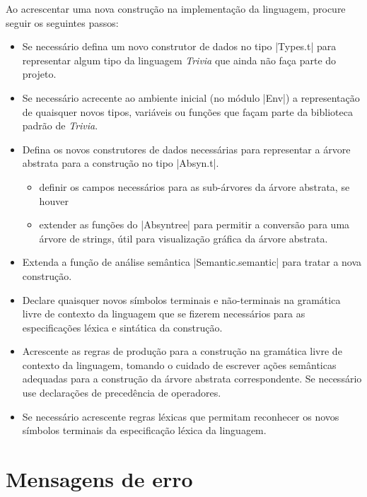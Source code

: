 \documentclass[a4paper,11pt,brazil]{article}
\newcommand{\lang}{\textsl{Trivia}}
\begin{document}
Ao acrescentar uma nova construção na implementação da linguagem, procure
seguir os seguintes passos:
\begin{itemize}
  \item Se necessário defina um novo construtor de dados no tipo
  \pyginline|Types.t| para representar algum tipo da linguagem \lang{}
  que ainda não faça parte do projeto.

  \item Se necessário acrecente ao ambiente inicial (no módulo
  \pyginline|Env|) a representação de quaisquer novos tipos, variáveis
  ou funções que façam parte da biblioteca padrão de \lang{}.

  \item Defina os novos construtores de dados necessárias para
  representar a árvore abstrata para a construção no tipo
  \pyginline|Absyn.t|.
  \begin{itemize}
    \item definir os campos necessários para as sub-árvores da árvore
    abstrata, se houver
    \item extender as funções do \pyginline|Absyntree| para permitir a
    conversão para uma árvore de strings, útil para visualização
    gráfica da árvore abstrata.
  \end{itemize}

  \item Extenda a função de análise semântica
  \pyginline|Semantic.semantic| para tratar a nova construção.

  \item Declare quaisquer novos símbolos terminais e não-terminais na
  gramática livre de contexto da linguagem que se fizerem necessários
  para as especificações léxica e sintática da construção.

  \item Acrescente as regras de produção para a construção na gramática livre
  de contexto da linguagem, tomando o cuidado de escrever ações semânticas
  adequadas para a construção da árvore abstrata correspondente. Se necessário
  use declarações de precedência de operadores.

  \item Se necessário acrescente regras léxicas que permitam reconhecer os
  novos símbolos terminais da especificação léxica da linguagem.
\end{itemize}

\section{Mensagens de erro}
\end{document}
